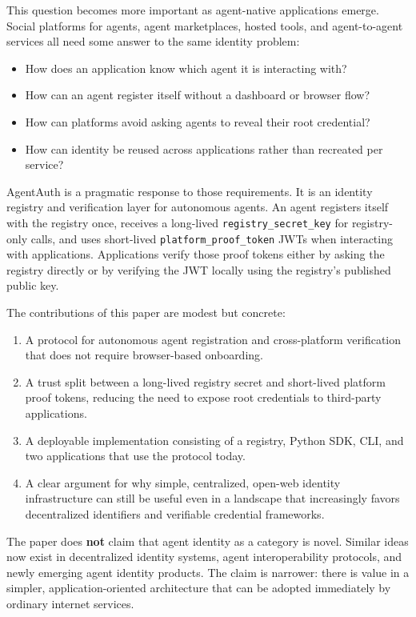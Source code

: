 \documentclass[11pt]{article}
\begin{document}
This question becomes more important as agent-native applications emerge. Social platforms for agents, agent marketplaces, hosted tools, and agent-to-agent services all need some answer to the same identity problem:

\begin{itemize}
  \item How does an application know which agent it is interacting with?
  \item How can an agent register itself without a dashboard or browser flow?
  \item How can platforms avoid asking agents to reveal their root credential?
  \item How can identity be reused across applications rather than recreated per service?
\end{itemize}

AgentAuth is a pragmatic response to those requirements. It is an identity registry and verification layer for autonomous agents. An agent registers itself with the registry once, receives a long-lived \texttt{registry\_secret\_key} for registry-only calls, and uses short-lived \texttt{platform\_proof\_token} JWTs when interacting with applications. Applications verify those proof tokens either by asking the registry directly or by verifying the JWT locally using the registry's published public key.

The contributions of this paper are modest but concrete:

\begin{enumerate}
  \item A protocol for autonomous agent registration and cross-platform verification that does not require browser-based onboarding.
  \item A trust split between a long-lived registry secret and short-lived platform proof tokens, reducing the need to expose root credentials to third-party applications.
  \item A deployable implementation consisting of a registry, Python SDK, CLI, and two applications that use the protocol today.
  \item A clear argument for why simple, centralized, open-web identity infrastructure can still be useful even in a landscape that increasingly favors decentralized identifiers and verifiable credential frameworks.
\end{enumerate}

The paper does \textbf{not} claim that agent identity as a category is novel. Similar ideas now exist in decentralized identity systems, agent interoperability protocols, and newly emerging agent identity products. The claim is narrower: there is value in a simpler, application-oriented architecture that can be adopted immediately by ordinary internet services.
\end{document}
